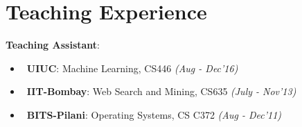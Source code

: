 \section{\mysidestyle Teaching Experience}
\vspace{-0mm}
\textsf{\textbf{Teaching Assistant}}:
\begin{itemize}[leftmargin = 0.7cm]\compresslist
\item~\textbf{UIUC}: Machine Learning, CS446 \hfill{\small\textit{(Aug - Dec'16)}}\vspace{-1mm}
\item~\textbf{IIT-Bombay}: Web Search and Mining, CS635 \hfill{\small\textit{(July - Nov'13)}}\vspace{-1mm}
\item~\textbf{BITS-Pilani}: Operating Systems, CS C372 \hfill{\small\textit{(Aug - Dec'11)}}
\end{itemize}